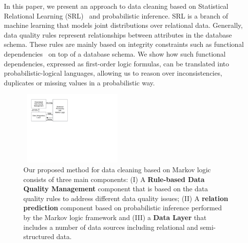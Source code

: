 
In this paper, we present an approach to data cleaning based on Statistical Relational Learning (SRL)~\cite{getoor2007introduction} and probabilistic inference. SRL is a branch of machine learning that models joint distributions over relational data. Generally, data quality rules represent relationships between attributes in the database schema. These rules are mainly based on integrity constraints such as functional dependencies~\cite{AbiteboulHV95} on top of a database schema. We show how such functional dependencies, expressed as first-order logic formulas, can be translated into probabilistic-logical languages, allowing us to reason over inconsistencies, duplicates or missing values in a probabilistic way.

 
 \begin{figure}[t]
 \centering
 \includegraphics[width=200px, height=140px]{img/system.pdf}
 \caption{Our proposed method for data cleaning based on Markov logic consists of three main components: 
 (I) A \textbf{Rule-based Data Quality Management} component that is based on the data quality rules to address different data quality issues;
 (II) A \textbf{relation prediction} component based on probabilistic inference performed by the Markov logic framework and (III) 
 a \textbf{Data Layer} that includes a number of data sources including relational and semi-structured data.}
 \label{fig:system}
\end{figure}     
